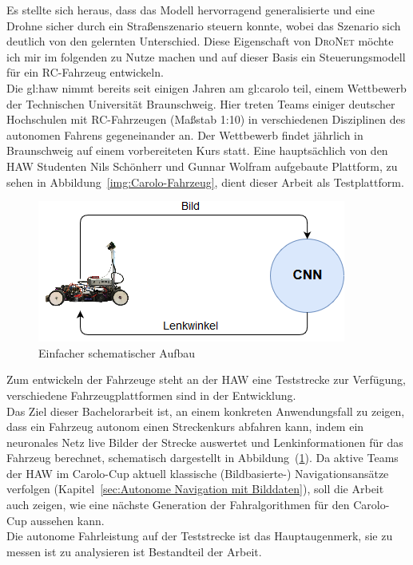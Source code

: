 Es stellte sich heraus, dass das Modell hervorragend generalisierte und eine Drohne sicher durch ein Straßenszenario steuern konnte, wobei das Szenario sich deutlich von den gelernten Unterschied. Diese Eigenschaft von \textsc{DroNet} möchte ich mir im folgenden zu Nutze machen und auf dieser Basis ein Steuerungsmodell für ein RC-Fahrzeug entwickeln.\\

Die \gls{gl:haw} nimmt bereits seit einigen Jahren am \glqq \gls{gl:carolo} \grqq{} teil, einem Wettbewerb der Technischen Universität Braunschweig. Hier treten Teams einiger deutscher Hochschulen mit RC-Fahrzeugen (Maßstab 1:10) in verschiedenen Disziplinen des autonomen Fahrens gegeneinander an. Der Wettbewerb findet jährlich in Braunschweig auf einem vorbereiteten Kurs statt.
Eine hauptsächlich von den HAW Studenten Nils Schönherr und Gunnar Wolfram aufgebaute Plattform, zu sehen in Abbildung~\ref{img:Carolo-Fahrzeug}, dient dieser Arbeit als Testplattform.

\begin{figure}[h]
	\centering
	\includegraphics[scale=0.7]{figures/Aufbau.png}
	\caption{Einfacher schematischer Aufbau }
	\label{img:Aufbau}
\end{figure}


Zum entwickeln der Fahrzeuge steht an der HAW eine Teststrecke zur Verfügung, verschiedene Fahrzeugplattformen sind in der Entwicklung.\\
Das Ziel dieser Bachelorarbeit ist, an einem konkreten Anwendungsfall zu zeigen, dass ein Fahrzeug autonom einen Streckenkurs abfahren kann, indem ein neuronales Netz live Bilder der Strecke auswertet und Lenkinformationen für das Fahrzeug berechnet, schematisch dargestellt in Abbildung~(\ref{img:Aufbau}). Da aktive Teams der HAW im Carolo-Cup aktuell klassische (Bildbasierte-) Navigationsansätze verfolgen (Kapitel~\ref{sec:Autonome Navigation mit Bilddaten}), soll die Arbeit auch zeigen, wie eine nächste Generation der Fahralgorithmen für den Carolo-Cup aussehen kann.\\

Die autonome Fahrleistung auf der Teststrecke ist das Hauptaugenmerk, sie zu messen ist zu analysieren ist Bestandteil der Arbeit.



